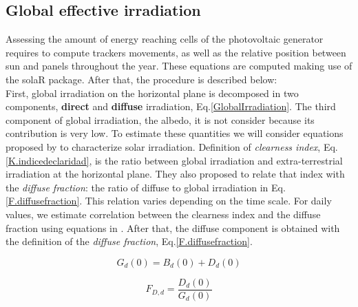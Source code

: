 \subsection{Global effective irradiation}

Assessing the amount of energy reaching cells of the photovoltaic generator requires to compute trackers movements, as well as the relative position between sun and panels throughout the year. These equations are computed making use of the solaR\cite*{Perpinan2012} package. After that, the procedure is described below:\\

First, global irradiation on the horizontal plane is decomposed in two components, \textbf{direct} and \textbf{diffuse} irradiation, Eq.\ref{GlobalIrradiation}. The third component of global irradiation, the albedo, it is  not consider because its contribution is very low. To estimate these quantities we will consider equations proposed by \cite{Liu1960} to characterize solar irradiation. Definition of \textit{clearness index}, Eq.\ref{K.indicedeclaridad}, is the ratio between global irradiation and extra-terrestrial irradiation at the horizontal plane. They also proposed to relate that index with the \textit{diffuse fraction}: the ratio of diffuse to global irradiation in Eq.\ref{F.diffusefraction}. This relation varies depending on the time scale. For daily values, we estimate correlation between the clearness index and the diffuse fraction using equations in \cite{Aguiar1992}. After that, the diffuse component is obtained with the definition of the \textit{diffuse fraction}, Eq.\ref{F.diffusefraction}.

\begin{equation}\label{GlobalIrradiation}
G_{d}(0) = B_{d}(0) + D_{d}(0)
\end{equation}



\begin{equation}\label{F.diffusefraction}
F_{D,d}=\frac{D_{d}(0)}{G_{d}(0)}
\end{equation}

